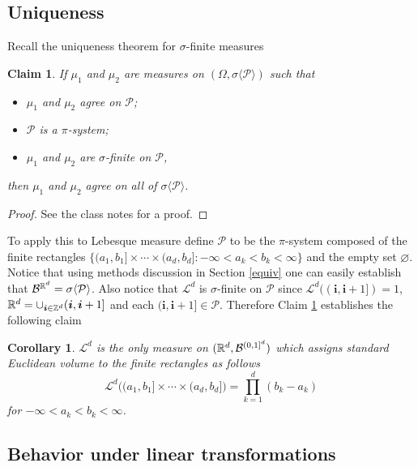 \documentclass[10pt,letterpaper,twocolumn]{article}
\newtheorem{corollary}{Corollary}
\newtheorem{claim}{Claim}
\newcommand{\bs}{\boldsymbol}
\begin{document}
\subsection{Uniqueness}
Recall the uniqueness theorem for $\sigma$-finite measures
\begin{claim}
\label{ui}
If $\mu_1$ and $\mu_2$ are measures on $(\Omega, \sigma\langle \mathcal P\rangle)$ such that 
\begin{itemize}
\item[(a)] $\mu_1$ and $\mu_2$ agree on $\mathcal P$;
\item[(b)] $\mathcal P$ is a $\pi$-system;
\item[(c)] $\mu_1$ and $\mu_2$ are $\sigma$-finite on $\mathcal P$,
\end{itemize}
then $\mu_1$ and $\mu_2$ agree on all of $ \sigma\langle \mathcal P\rangle$.
\end{claim}
\begin{proof}
See the class notes for a proof.
\end{proof}

To apply this to Lebesque measure define $\mathcal P$ to be the $\pi$-system composed of the finite rectangles $\{ (a_1,b_1]\times \cdots \times (a_d,b_d]: -\infty < a_k < b_k <\infty\}$ and the empty set $\varnothing$. Notice that using methods discussion in Section \ref{equiv} one can easily establish that $\mathcal B^{\Bbb R^d}=\sigma\langle\mathcal P\rangle$.  
 Also notice that $\mathcal L^d$ is $\sigma$-finite on $\mathcal P$ since  $\mathcal L^d\bigl((\bs i,\bs i+1])=1$, $\Bbb R^d = \cup_{\bs i\in\Bbb Z^d} (\bs i,\bs i+1]$ and each $(\bs i,\bs i+1]\in \mathcal P$.
 Therefore Claim \ref{ui} establishes the following claim
 
 \begin{corollary}
 \label{ui2}
  $\mathcal L^d$ is the only measure on $(\Bbb R^d,\mathcal B^{(0,1]^d})$ which assigns standard Euclidean volume to the finite rectangles as follows
 \begin{equation}
\mathcal L^d \bigl( (a_1,b_1]\times \cdots \times (a_d,b_d]\bigr)=\prod_{k=1}^d (b_k - a_k)
\end{equation}
for $-\infty < a_k < b_k <\infty$.
\end{corollary}
 

\subsection{Behavior under linear transformations}
\end{document}
